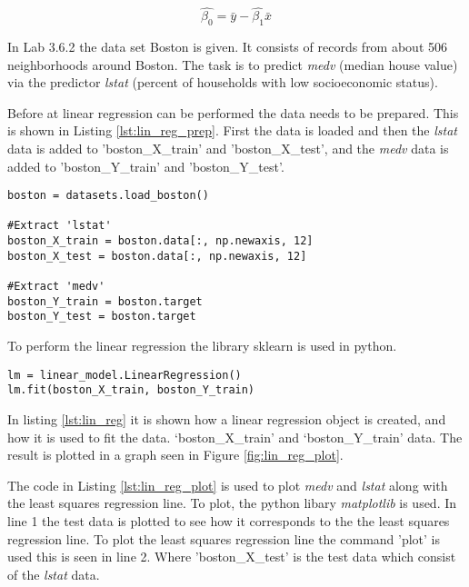 \begin{equation}
\hat{\beta_0} = \bar{y} -\hat{\beta_1}\bar{x}
\end{equation}

In Lab 3.6.2 the data set Boston is given. It consists of records from about 506 neighborhoods around Boston. The task is to predict \emph{medv} (median house value) via the predictor \emph{lstat} (percent of households with low socioeconomic status).

Before at linear regression can be performed the data needs to be prepared. This is shown in Listing \ref{lst:lin_reg_prep}. First the data is loaded and then the \emph{lstat} data is added to 'boston\_X\_train' and 'boston\_X\_test', and the \emph{medv} data is added to 'boston\_Y\_train' and 'boston\_Y\_test'.

\begin{lstlisting}[caption={Data preparation for linear regression}, label=lst:lin_reg_prep, mathescape=true]
boston = datasets.load_boston()

#Extract 'lstat'
boston_X_train = boston.data[:, np.newaxis, 12]
boston_X_test = boston.data[:, np.newaxis, 12]

#Extract 'medv'
boston_Y_train = boston.target
boston_Y_test = boston.target
\end{lstlisting}

To perform the linear regression the library sklearn is used in python. 


\begin{lstlisting}[caption={Python Linear Regression function}, label=lst:lin_reg, mathescape=true]
lm = linear_model.LinearRegression()
lm.fit(boston_X_train, boston_Y_train)
\end{lstlisting}

In listing \ref{lst:lin_reg} it is shown how a linear regression object is created, and how it is used to fit the data. ‘boston\_X\_train’ and ‘boston\_Y\_train’ data.
The result is plotted in a graph seen in Figure \ref{fig:lin_reg_plot}.


The code in Listing \ref{lst:lin_reg_plot} is used to plot \emph{medv} and \emph{lstat} along with the least squares regression line. To plot, the python libary \emph{matplotlib} is used. In line 1 the test data is plotted to see how it corresponds to the the least squares regression line. To plot the least squares regression line the command 'plot' is used this is seen in line 2. Where 'boston\_X\_test' is the test data which consist of the \emph{lstat} data. 

